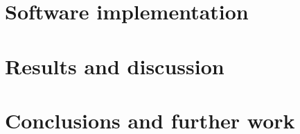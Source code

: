 \documentclass[runningheads]{llncs}
\begin{document}
\noindent 
\section{Software implementation}\label{sof}

\section{Results and discussion}\label{res}

\section{Conclusions and further work}\label{con}



%
% 
% 
% 
% 
\end{document}
